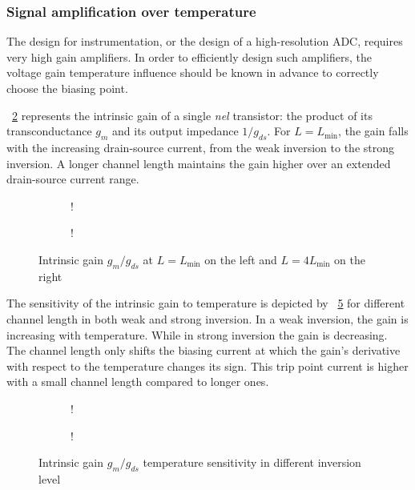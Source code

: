 \subsubsection{Signal amplification over temperature}
\label{sec:des_accuracy}
The design for instrumentation, or the design of a high-resolution ADC, requires very high gain amplifiers. In order to efficiently design such amplifiers, the voltage gain temperature influence should be known in advance to correctly choose the biasing point.

\figurename~\ref{fig:Av_nel} represents the intrinsic gain of a single \emph{nel} transistor: the product of its transconductance \(g_m \) and its output impedance \(1/g_{ds} \). For \(L = L_{\min} \), the gain falls with the increasing drain-source current, from the weak inversion to the strong inversion. A longer channel length maintains the gain higher over an extended drain-source current range.
\begin{figure}[!ht]
	\centering
	\begin{subfigure}[b]{0.48\textwidth}
		\resizebox {\textwidth} {!} {
			
		}
	\end{subfigure}
	\begin{subfigure}[b]{0.48\textwidth}
		\resizebox {\textwidth} {!} {
			
		}
		\label{fig:Av_nel_sensitivity}
	\end{subfigure}
	\caption{Intrinsic gain \(g_m/g_{ds} \) at \(L = L_{\min}\) on the left and \(L = 4 L_{\min}\) on the right}
	\label{fig:Av_nel}
\end{figure}

The sensitivity of the intrinsic gain to temperature is depicted by \figurename~\ref{fig:sAv_nel} for different channel length in both weak and strong inversion. In a weak inversion, the gain is increasing with temperature. While in strong inversion the gain is decreasing. The channel length only shifts the biasing current at which the gain's derivative with respect to the temperature changes its sign. This trip point current is higher with a small channel length compared to longer ones.
\begin{figure}[!ht]
	\centering
	\begin{subfigure}[b]{0.48\textwidth}
		\resizebox {\textwidth} {!} {
			
		}
		\label{fig:Av_nel_sensitivity_wi}
	\end{subfigure}
	\begin{subfigure}[b]{0.48\textwidth}
		\resizebox {\textwidth} {!} {
			
		}
		\label{fig:Av_nel_sensitivity_si}
	\end{subfigure}
	\caption{Intrinsic gain \(g_m/g_{ds} \) temperature sensitivity in different inversion level}
	\label{fig:sAv_nel}
\end{figure}

